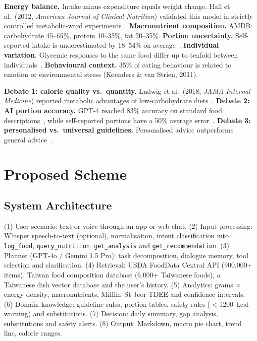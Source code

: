 \documentclass[conference]{IEEEtran}
\begin{document}
\textbf{Energy balance.} Intake minus expenditure equals weight change. Hall et al.\ (2012, \emph{American Journal of Clinical Nutrition}) validated this model in strictly controlled metabolic-ward experiments~\cite{hall2012}.
\textbf{Macronutrient composition.} AMDR: carbohydrate 45--65\%, protein 10--35\%, fat 20--35\%.
\textbf{Portion uncertainty.} Self-reported intake is underestimated by 18--54\% on average~\cite{poslusna2009}.
\textbf{Individual variation.} Glycemic responses to the same food differ up to tenfold between individuals~\cite{zeevi2015}.
\textbf{Behavioural context.} 35\% of eating behaviour is related to emotion or environmental stress (Koenders \& van Strien, 2011).

\textbf{Debate 1: calorie quality vs.\ quantity.} Ludwig et al.\ (2018, \emph{JAMA Internal Medicine}) reported metabolic advantages of low-carbohydrate diets~\cite{ludwig2018}.
\textbf{Debate 2: AI portion accuracy.} GPT-4 reached 83\% accuracy on standard food descriptions~\cite{cheng2024}, while self-reported portions have a 50\% average error~\cite{subar2015}.
\textbf{Debate 3: personalised vs.\ universal guidelines.} Personalised advice outperforms general advice~\cite{zeevi2015}.

\section{Proposed Scheme}

\subsection{System Architecture}
(1) User scenario: text or voice through an app or web chat. (2) Input processing: Whisper speech-to-text (optional), normalisation, intent classification into \texttt{log\_food}, \texttt{query\_nutrition}, \texttt{get\_analysis} and \texttt{get\_recommendation}. (3) Planner (GPT-4o / Gemini 1.5 Pro): task decomposition, dialogue memory, tool selection and clarification. (4) Retrieval: USDA FoodData Central API (900{,}000+ items), Taiwan food composition database (6{,}000+ Taiwanese foods), a Taiwanese dish vector database and the user's history. (5) Analytics: grams $\times$ energy density, macronutrients, Mifflin--St Jeor TDEE and confidence intervals. (6) Domain knowledge: guideline rules, portion tables, safety rules ($<$1200~kcal warning) and substitutions. (7) Decision: daily summary, gap analysis, substitutions and safety alerts. (8) Output: Markdown, macro pie chart, trend line, calorie ranges.
\end{document}
